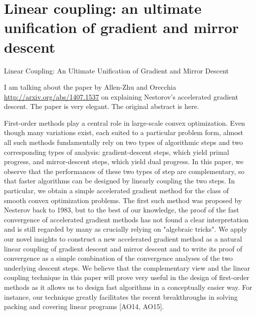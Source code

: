 \def\filepath{C:/Users/Owner/Dropbox/Math/templates}





%


%

\pagestyle{fancy}
\chead{} 
\rhead{} 
\lfoot{} 
\cfoot{\thepage} 
\rfoot{} 
\renewcommand{\headrulewidth}{.3pt} 
\setlength\voffset{0in}
\setlength\textheight{648pt}



\tableofcontents

\section{Linear coupling: an ultimate unification of gradient and mirror descent}

Linear Coupling: An Ultimate Unification of Gradient and Mirror Descent

I am talking about the paper by Allen-Zhu and Orecchia \url{http://arxiv.org/abs/1407.1537} on explaining Nestorov's accelerated gradient descent. The paper is very elegant. The original abstract is here. 

First-order methods play a central role in large-scale convex optimization. Even though many variations exist, each suited to a particular problem form, almost all such methods fundamentally rely on two types of algorithmic steps and two corresponding types of analysis: gradient-descent steps, which yield primal progress, and mirror-descent steps, which yield dual progress. In this paper, we observe that the performances of these two types of step are complementary, so that faster algorithms can be designed by linearly coupling the two steps. 
In particular, we obtain a simple accelerated gradient method for the class of smooth convex optimization problems. The first such method was proposed by Nesterov back to 1983, but to the best of our knowledge, the proof of the fast convergence of accelerated gradient methods has not found a clear interpretation and is still regarded by many as crucially relying on "algebraic tricks". We apply our novel insights to construct a new accelerated gradient method as a natural linear coupling of gradient descent and mirror descent and to write its proof of convergence as a simple combination of the convergence analyses of the two underlying descent steps. 
We believe that the complementary view and the linear coupling technique in this paper will prove very useful in the design of first-order methods as it allows us to design fast algorithms in a conceptually easier way. For instance, our technique greatly facilitates the recent breakthroughs in solving packing and covering linear programs [AO14, AO15].

